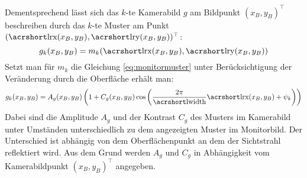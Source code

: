 %
Dementsprechend lässt sich das $k$-te Kamerabild $g$ am Bildpunkt $(x_B, y_B)^\top$ beschreiben durch das $k$-te Muster am Punkt $(\acrshortmath{lrx}(x_B, y_B), \acrshortmath{lry}(x_B, y_B))^\top$:
%
\begin{equation}
	g_k(x_B, y_B) = m_k(\acrshortmath{lrx}(x_B, y_B), \acrshortmath{lry}(x_B, y_B))
\end{equation}
%
Setzt man für $m_k$ die Gleichung \ref{eq:monitormuster} unter Berücksichtigung der Veränderung durch die Oberfläche erhält man:
%
\begin{equation}\label{eq:kamerabild}
	g_k(x_B, y_B) = A_g(x_B, y_B) \left(1 + C_g(x_B, y_B) \cos \left(\dfrac{2\pi}{\acrshortmath{lwidth}}\acrshortmath{lrx}(x_B, y_B) + \psi_k\right)\right)
\end{equation}
%
Dabei sind die Amplitude $A_g$ und der Kontrast $C_g$ des Musters im Kamerabild unter Umständen unterschiedlich zu dem angezeigten Muster im Monitorbild.
Der Unterschied ist abhängig von dem Oberflächenpunkt an dem der Sichtstrahl reflektiert wird.
Aus dem Grund werden $A_g$ und $C_g$ in Abhängigkeit vom Kamerabildpunkt $(x_B, y_B)^\top$ angegeben.

